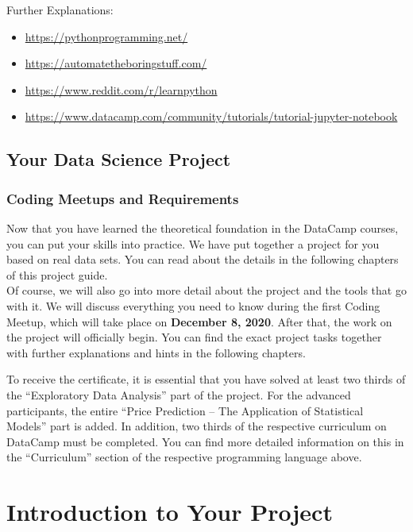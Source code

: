 \documentclass[
  11pt,
]{article}
\providecommand{\tightlist}{%
  \setlength{\itemsep}{0pt}\setlength{\parskip}{0pt}}
\begin{document}
Further Explanations:

\begin{itemize}
\tightlist
\item
  \url{https://pythonprogramming.net/}
\item
  \url{https://automatetheboringstuff.com/}
\item
  \url{https://www.reddit.com/r/learnpython}
\item
  \url{https://www.datacamp.com/community/tutorials/tutorial-jupyter-notebook}
\end{itemize}

\hypertarget{your-data-science-project}{%
\subsection{Your Data Science Project}\label{your-data-science-project}}

\hypertarget{coding-meetups-and-requirements}{%
\subsubsection{Coding Meetups and Requirements}\label{coding-meetups-and-requirements}}

Now that you have learned the theoretical foundation in the DataCamp courses, you can put your skills into practice. We have put together a project for you based on real data sets. You can read about the details in the following chapters of this project guide.\\
Of course, we will also go into more detail about the project and the tools that go with it. We will discuss everything you need to know during the first Coding Meetup, which will take place on \textbf{December 8, 2020}. After that, the work on the project will officially begin.
You can find the exact project tasks together with further explanations and hints in the following chapters.

To receive the certificate, it is essential that you have solved at least two thirds of the ``Exploratory Data Analysis'' part of the project. For the advanced participants, the entire ``Price Prediction -- The Application of Statistical Models'' part is added. In addition, two thirds of the respective curriculum on DataCamp must be completed. You can find more detailed information on this in the ``Curriculum'' section of the respective programming language above.

\newpage

\hypertarget{introduction-to-your-project}{%
\section{Introduction to Your Project}\label{introduction-to-your-project}}
\end{document}
